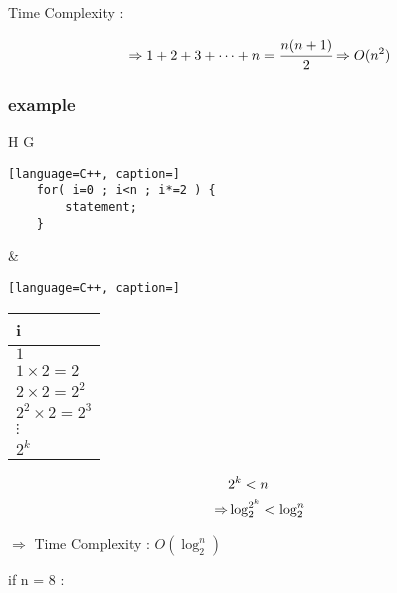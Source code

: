 \documentclass[12pt]{article}
\begin{document}
Time Complexity : 


\begin{align*}
\Rightarrow 1 + 2 + 3 + \dots + n = \cfrac{n(n+1)}{2} \Rightarrow O(n^{2})
\end{align*}





\subsubsection{example}


\begin{center}
  \bgroup
  \def\arraystretch{1.5}%
  \begin{tabular}{ H  G  }
	\begin{lstlisting}[language=C++, caption=]
	for( i=0 ; i<n ; i*=2 ) {
		statement;
	}
	\end{lstlisting}
     &  
	\begin{lstlisting}[language=C++, caption=]

	\end{lstlisting}
  \end{tabular}
  \egroup
\end{center}



\begin{center}
  \bgroup
  \def\arraystretch{1.5}%
  \begin{tabular}{ l  }
	i
     \\ \hline
     $1$
     \\
     $1 \times 2 = 2$
     \\
     $2 \times 2 = 2^{2}$
     \\
     $2^{2} \times 2 = 2^{3}$
     \\
     $\vdots$
     \\
     $2^{k}$
     \\
  \end{tabular}
  \egroup
\end{center}




\begin{align*}
\Large
&2^{k}< n \\
\Rightarrow &\log^{2^{k}}_{2} < \log^{n}_{2}
\end{align*}


$\Rightarrow$ Time Complexity : $O(\log^{n}_{2})$

\vspace{30pt}

if n = 8 :
\end{document}
